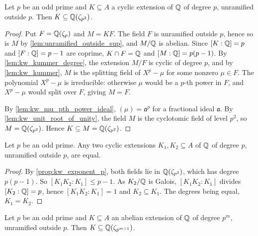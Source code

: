 \begin{proposition}
  \label{prop:kw_exponent_p}
  \leanok
  Let $p$ be an odd prime and $K \subseteq A$ a cyclic extension of $\mathbb{Q}$ of degree $p$,
  unramified outside $p$. Then $K \subseteq \mathbb{Q}(\zeta_{p^2})$.
\end{proposition}

\begin{proof}
  \leanok
  Put $F = \mathbb{Q}(\zeta_p)$ and $M = KF$. The field $F$ is
  unramified outside $p$, hence so is $M$ by \ref{lem:unramified_outside_sup}, and $M/\mathbb{Q}$ is
  abelian. Since $[K:\mathbb{Q}] = p$ and $[F:\mathbb{Q}] = p-1$ are coprime, $K \cap F = \mathbb{Q}$ and $[M:\mathbb{Q}] =
  p(p-1)$. By \ref{lem:kw_kummer_degree}, the extension $M/F$ is cyclic of degree $p$, and by
  \ref{lem:kw_kummer}, $M$ is the splitting field of $X^p - \mu$ for some nonzero $\mu \in F$.
  The polynomial $X^p - \mu$ is irreducible: otherwise $\mu$ would be a $p$-th power in $F$, and
  $X^p - \mu$ would split over $F$, giving $M = F$.

  By \ref{lem:kw_mu_pth_power_ideal}, $(\mu) = \mathfrak{a}^p$ for a fractional ideal
  $\mathfrak{a}$. By \ref{lem:kw_unit_root_of_unity}, the field $M$ is the cyclotomic field of
  level $p^2$, so $M = \mathbb{Q}(\zeta_{p^2})$. Hence $K \subseteq M = \mathbb{Q}(\zeta_{p^2})$.
\end{proof}

\begin{corollary}
  \label{cor:kw_exponent_p_unique}
  \leanok
  Let $p$ be an odd prime. Any two cyclic extensions $K_1, K_2 \subseteq A$ of $\mathbb{Q}$ of degree
  $p$, unramified outside $p$, are equal.
\end{corollary}

\begin{proof}
  \leanok
  By \ref{prop:kw_exponent_p}, both fields lie in $\mathbb{Q}(\zeta_{p^2})$, which has degree $p(p-1)$.
  So $[K_1K_2 : K_1] \leq p - 1$. As $K_2/\mathbb{Q}$ is Galois, $[K_1K_2 : K_1]$ divides $[K_2:\mathbb{Q}] =
  p$, hence $[K_1K_2 : K_1] = 1$ and $K_2 \subseteq K_1$. The degrees being equal, $K_1 = K_2$.
\end{proof}

\begin{proposition}
  \label{prop:kw_odd_prime_power}
  \leanok
  Let $p$ be an odd prime and $K \subseteq A$ an abelian extension of $\mathbb{Q}$ of degree $p^m$,
  unramified outside $p$. Then $K \subseteq \mathbb{Q}(\zeta_{p^{m+1}})$.
\end{proposition}

